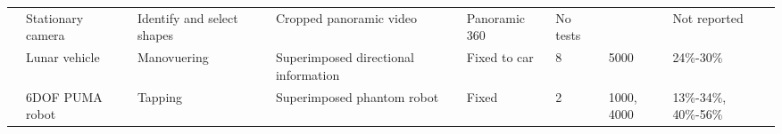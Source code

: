 \begin{wraptable}{r}{0.4\textwidth}
{{\begin{tabular}{@{}llllllll@{}}
\cite{Baldwin1999}       & Stationary camera         & Identify and select shapes & Cropped panoramic video                  & Panoramic 360       & No tests     &                & Not reported         \\
\cite{Mathan1996}        & Lunar vehicle             & Manovuering                & Superimposed directional information     & Fixed to car        & 8            & 5000           & 24\%-30\%            \\
\cite{Bejczy1990}        & 6DOF PUMA robot           & Tapping                    & Superimposed phantom robot               & Fixed               & 2            & 1000, 4000     & 13\%-34\%, 40\%-56\% \\ \bottomrule
\end{tabular}
}
}
\end{wraptable}